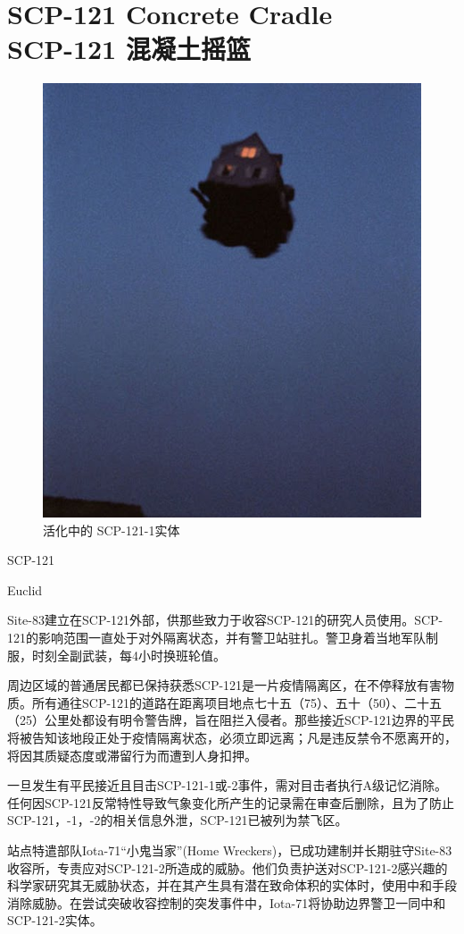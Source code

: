 \chapter[SCP-121 混凝土摇篮]{
    SCP-121 Concrete Cradle\\
    SCP-121 混凝土摇篮
}

\label{chap:SCP-121}

\begin{figure}[H]
    \centering
    \includegraphics[width=0.5\linewidth]{images/SCP-121.png}
    \caption*{活化中的 SCP-121-1实体}
\end{figure}

SCP-121

Euclid

Site-83建立在SCP-121外部，供那些致力于收容SCP-121的研究人员使用。SCP-121的影响范围一直处于对外隔离状态，并有警卫站驻扎。警卫身着当地军队制服，时刻全副武装，每4小时换班轮值。

周边区域的普通居民都已保持获悉SCP-121是一片疫情隔离区，在不停释放有害物质。所有通往SCP-121的道路在距离项目地点七十五（75）、五十（50）、二十五（25）公里处都设有明令警告牌，旨在阻拦入侵者。那些接近SCP-121边界的平民将被告知该地段正处于疫情隔离状态，必须立即远离；凡是违反禁令不愿离开的，将因其质疑态度或滞留行为而遭到人身扣押。

一旦发生有平民接近且目击SCP-121-1或-2事件，需对目击者执行A级记忆消除。任何因SCP-121反常特性导致气象变化所产生的记录需在审查后删除，且为了防止SCP-121，-1，-2的相关信息外泄，SCP-121已被列为禁飞区。

站点特遣部队Iota-71“小鬼当家”(Home Wreckers)，已成功建制并长期驻守Site-83收容所，专责应对SCP-121-2所造成的威胁。他们负责护送对SCP-121-2感兴趣的科学家研究其无威胁状态，并在其产生具有潜在致命体积的实体时，使用中和手段消除威胁。在尝试突破收容控制的突发事件中，Iota-71将协助边界警卫一同中和SCP-121-2实体。

